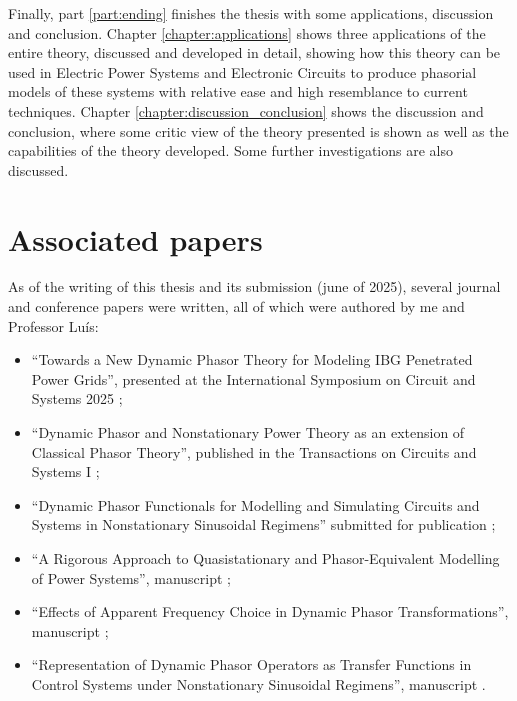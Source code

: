 	Finally, part \ref{part:ending} finishes the thesis with some applications, discussion and conclusion. Chapter \ref{chapter:applications} shows three applications of the entire theory, discussed and developed in detail, showing how this theory can be used in Electric Power Systems and Electronic Circuits to produce phasorial models of these systems with relative ease and high resemblance to current techniques. Chapter \ref{chapter:discussion_conclusion} shows the discussion and conclusion, where some critic view of the theory presented is shown as well as the capabilities of the theory developed. Some further investigations are also discussed.

\section{Associated papers} %

	As of the writing of this thesis and its submission (june of 2025), several journal and conference papers were written, all of which were authored by me and Professor Luís:

\begin{itemize}
	\item ``Towards a New Dynamic Phasor Theory for Modeling IBG Penetrated Power Grids'', presented at the International Symposium on Circuit and Systems 2025 ;
	\item ``Dynamic Phasor and Nonstationary Power Theory as an extension of Classical Phasor Theory'', published in the Transactions on Circuits and Systems I ;
	\item ``Dynamic Phasor Functionals for Modelling and Simulating Circuits and Systems in Nonstationary Sinusoidal Regimens'' submitted for publication ;
	\item ``A Rigorous Approach to Quasistationary and Phasor-Equivalent Modelling of Power Systems'', manuscript ;
	\item ``Effects of Apparent Frequency Choice in Dynamic Phasor Transformations'', manuscript ;
	\item ``Representation of Dynamic Phasor Operators as Transfer Functions in Control Systems under Nonstationary Sinusoidal Regimens'', manuscript .
\end{itemize}


